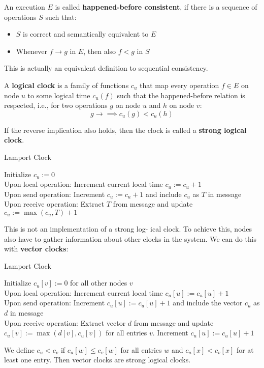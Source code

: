 An execution $E$ is called \textbf{happened-before consistent}, if there is a sequence of operations $S$ such that:
\begin{itemize}
	\item $S$ is correct and semantically equivalent to $E$
	\item Whenever $f \to g$ in $E$, then also $f<g$ in $S$
\end{itemize}

This is actually an equivalent definition to sequential consistency. \medskip

A \textbf{logical clock} is a family of functions $c_u$ that map every operation $f \in E$ on node $u$ to some logical time $c_u(f)$ such that the happened-before relation is respected, i.e., for two operations $g$ on node $u$ and $h$ on node $v$:
$$g \to \implies c_u(g) < c_u(h)$$

If the reverse implication also holds, then the clock is called a \textbf{strong logical clock}. \medskip

\begin{algorithm}[H]
\caption{Lamport Clock}
	Initialize $c_u := 0$ \\
	Upon local operation: Increment current local time $c_u := c_u + 1$ \\
	Upon send operation: Increment $c_u := c_u + 1$ and include $c_u$ as $T$ in message \\
	Upon receive operation: Extract $T$ from message and update $c_u := \max (c_u,T) + 1$
\end{algorithm}
\medskip

This is not an implementation of a strong log- ical clock. To achieve this, nodes also have to gather information about other clocks in the system. We can do this with \textbf{vector clocks}: \medskip

\begin{algorithm}[H]
\caption{Lamport Clock}
	Initialize $c_u[v] := 0$ for all other nodes $v$ \\
	Upon local operation: Increment current local time $c_u[u] := c_u[u] + 1$ \\
	Upon send operation: Increment $c_u[u] := c_u[u] + 1$ and include the vector $c_u$ as $d$ in message \\
	Upon receive operation: Extract vector $d$ from message and update $c_u[v] := \max (d[v], c_u[v])$ for all entries $v$. Increment $c_u[u] := c_u[u] + 1$
\end{algorithm}
\medskip

We define $c_u < c_v$ if $c_u[w] \leq c_v[w]$ for all entries $w$ and $c_u[x] < c_v[x]$ for at least one entry. Then vector clocks are strong logical clocks. \medskip

